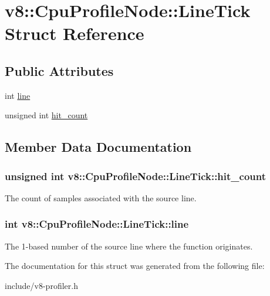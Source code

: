 \hypertarget{structv8_1_1_cpu_profile_node_1_1_line_tick}{}\section{v8\+:\+:Cpu\+Profile\+Node\+:\+:Line\+Tick Struct Reference}
\label{structv8_1_1_cpu_profile_node_1_1_line_tick}
\subsection*{Public Attributes}
\begin{DoxyCompactItemize}
\item 
int \hyperlink{structv8_1_1_cpu_profile_node_1_1_line_tick_af96fbdefbc07b2c84cf41d74555626f6}{line}
\item 
unsigned int \hyperlink{structv8_1_1_cpu_profile_node_1_1_line_tick_a62653fb1e6d381a5747d24b83aab1c1b}{hit\+\_\+count}
\end{DoxyCompactItemize}


\subsection{Member Data Documentation}
\subsubsection[{\texorpdfstring{hit\+\_\+count}{hit_count}}]{\setlength{\rightskip}{0pt plus 5cm}unsigned int v8\+::\+Cpu\+Profile\+Node\+::\+Line\+Tick\+::hit\+\_\+count}\hypertarget{structv8_1_1_cpu_profile_node_1_1_line_tick_a62653fb1e6d381a5747d24b83aab1c1b}{}\label{structv8_1_1_cpu_profile_node_1_1_line_tick_a62653fb1e6d381a5747d24b83aab1c1b}
The count of samples associated with the source line. 
\subsubsection[{\texorpdfstring{line}{line}}]{\setlength{\rightskip}{0pt plus 5cm}int v8\+::\+Cpu\+Profile\+Node\+::\+Line\+Tick\+::line}\hypertarget{structv8_1_1_cpu_profile_node_1_1_line_tick_af96fbdefbc07b2c84cf41d74555626f6}{}\label{structv8_1_1_cpu_profile_node_1_1_line_tick_af96fbdefbc07b2c84cf41d74555626f6}
The 1-\/based number of the source line where the function originates. 

The documentation for this struct was generated from the following file\+:\begin{DoxyCompactItemize}
\item 
include/v8-\/profiler.\+h\end{DoxyCompactItemize}
